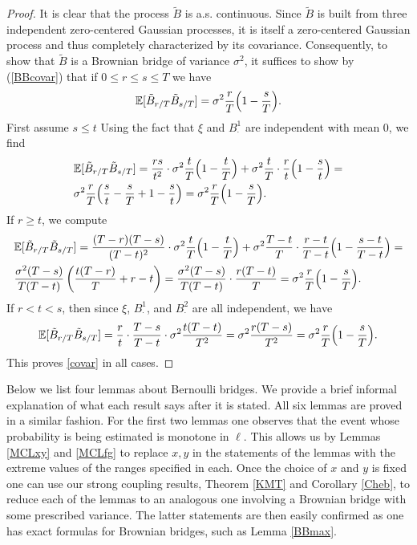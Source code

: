 \begin{proof}
	It is clear that the process $\tilde{B}$ is a.s. continuous. Since $\tilde{B}$ is built from three independent zero-centered Gaussian processes, it is itself a zero-centered Gaussian process and thus completely characterized by its covariance. Consequently, to show that $\tilde{B}$ is a Brownian bridge of variance $\sigma^2$, it suffices to show by (\ref{BBcovar}) that if $0\leq r\leq s\leq T$ we have
	\begin{equation}\label{covar}
	\mathbb{E}[\tilde{B}_{r/T}\tilde{B}_{s/T}] = \sigma^2 \frac{r}{T}\Big(1-\frac{s}{T}\Big).
	\end{equation}
	First assume $s\leq t$ Using the fact that $\xi$ and $B^1_\cdot$ are independent with mean 0, we find
	\begin{equation*}
	\begin{split}
	&\mathbb{E}[\tilde{B}_{r/T}\tilde{B}_{s/T}] = \frac{rs}{t^2}\cdot\sigma^2\frac{t}{T}\Big(1-\frac{t}{T}\Big) + \sigma^2\frac{t}{T}\cdot\frac{r}{t}\Big(1-\frac{s}{t}\Big) =\\
	&\sigma^2\frac{r}{T}\Big(\frac{s}{t} - \frac{s}{T} + 1 - \frac{s}{t}\Big) = \sigma^2\frac{r}{T}\Big(1-\frac{s}{T}\Big).
	\end{split}
	\end{equation*}
	If $r\geq t$, we compute
	\begin{equation*}
	\begin{split}
	&\mathbb{E}[\tilde{B}_{r/T}\tilde{B}_{s/T}] = \frac{(T-r)(T-s)}{(T-t)^2}\cdot\sigma^2\frac{t}{T}\Big( 1 - \frac{t}{T}\Big) + \sigma^2\frac{T-t}{T}\cdot\frac{r-t}{T-t}\Big( 1 - \frac{s-t}{T-t}\Big) =\\
	&\frac{\sigma^2(T-s)}{T(T-t)}\left(\frac{t(T-r)}{T} + r-t\right) = \frac{\sigma^2(T-s)}{T(T-t)}\cdot\frac{r(T-t)}{T} = \sigma^2\frac{r}{T}\Big(1-\frac{s}{T}\Big).
	\end{split}
	\end{equation*}
	If $r < t < s$, then since $\xi$, $B^1_\cdot$, and $B^2_\cdot$ are all independent, we have
	\[
	\mathbb{E}[\tilde{B}_{r/T}\tilde{B}_{s/T}] = \frac{r}{t}\cdot\frac{T-s}{T-t}\cdot\sigma^2\frac{t(T-t)}{T^2} = \sigma^2\frac{r(T-s)}{T^2} = \sigma^2\frac{r}{T}\Big(1-\frac{s}{T}\Big).
	\]
	This proves \eqref{covar} in all cases.
\end{proof}

Below we list four lemmas about Bernoulli bridges. We provide a brief informal explanation of what each result says after it is stated. All six lemmas are proved in a similar fashion. For the first two lemmas one observes that the event whose probability is being estimated is monotone in $\ell$. This allows us by Lemmas \ref{MCLxy} and \ref{MCLfg} to replace $x,y$ in the statements of the lemmas with the extreme values of the ranges specified in each. Once the choice of $x$ and $y$ is fixed one can use our strong coupling results, Theorem \ref{KMT} and Corollary \ref{Cheb}, to reduce each of the lemmas to an analogous one involving a Brownian bridge with some prescribed variance. The latter statements are then easily confirmed as one has exact formulas for Brownian bridges, such as Lemma \ref{BBmax}.\\

